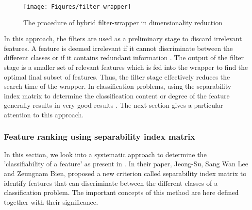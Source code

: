 \begin{figure}[ht!]
	\centering
	\texttt{[image: Figures/filter-wrapper]}
	\caption{The procedure of hybrid filter-wrapper in dimensionality reduction}{\cite{hybr2011}}
	\label{fig:filt-wrap}
\end{figure}
In this approach, the filters are used as a preliminary stage to discard irrelevant features. A feature is deemed irrelevant if it cannot discriminate between the different classes or if it contains redundant information \cite{hybr2011}.
The output of the filter stage is a smaller set of relevant features which is fed into the wrapper to find the optimal final subset of features. Thus, the filter stage effectively reduces the search time of the wrapper. 
In classification problems, using the separability index matrix to determine the classification content or degree of the feature generally results in very good results \cite{sima2013}. 
The next section gives a particular attention to this approach.

\subsubsection{Feature ranking using separability index matrix}
In this section, we look into a systematic approach to determine the 'classifiability of a feature' as present in \cite{sima2013}.
In their paper, Jeong-Su, Sang Wan Lee and Zeungnam Bien, proposed a new criterion called separability index matrix to identify features that can discriminate between the different classes of a classification problem.
The important concepts of this method are here defined together with their significance.

